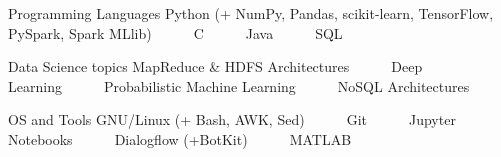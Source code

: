 

\begin{cvskills}

  \cvskill
    {Programming Languages} %
    {Python (+ NumPy, Pandas, scikit-learn, TensorFlow, PySpark, Spark MLlib)~~~\textbullet~~~C~~~\textbullet~~~Java~~~\textbullet~~~SQL} %

  \cvskill
    {Data Science topics} %
    {MapReduce \& HDFS Architectures~~~\textbullet~~~Deep Learning~~~\textbullet~~~Probabilistic Machine Learning~~~\textbullet~~~NoSQL Architectures} %

  \cvskill
    {OS and Tools} %
    {GNU/Linux (+ Bash, AWK, Sed)~~~\textbullet~~~Git~~~\textbullet~~~Jupyter Notebooks~~~\textbullet~~~Dialogflow (+BotKit)~~~\textbullet~~~MATLAB} %

\end{cvskills}
